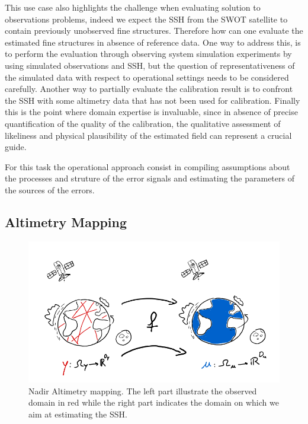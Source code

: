 \begin{bibunit}
This use case also highlights the challenge when evaluating solution to observations problems, indeed we expect the SSH from the SWOT satellite to contain previously unobserved fine structures.
Therefore how can one evaluate the estimated fine structures in absence of reference data.
One way to address this, is to perform the evaluation through observing system simulation experiments by using simulated observations and SSH, but the question of representativeness of the simulated data with respect to operational settings needs to be considered carefully.
Another way to partially evaluate the calibration result is to confront the SSH with some altimetry data that has not been used for calibration.
Finally this is the point where domain expertise is invaluable, since in absence of precise quantification of the quality of the calibration, the qualitative assessment of likeliness and physical plausibility of the estimated field can represent a crucial guide.

For this task the operational approach consist in compiling assumptions about the processes and struture of the error signals and estimating the parameters of the sources of the errors.



\subsection{Altimetry Mapping}

  \begin{figure}
      \centering
            \includegraphics[width=\linewidth]{Introduction/pics/mapping_task.png}
      \caption{Nadir Altimetry mapping. The left part illustrate the observed domain in red while the right part indicates the domain on which we aim at estimating the SSH.}
      \label{fig:mapping_task}
  \end{figure}


\end{bibunit}
